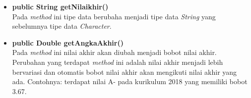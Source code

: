 \begin{enumerate}
\begin{itemize}
\begin{itemize}
					\item \textbf{public String getNilaikhir()}\\
						Pada \textit{method} ini tipe data berubaha menjadi tipe data \textit{String} yang sebelumnya tipe data \textit{Character}.
					
					\item \textbf{public Double getAngkaAkhir()}\\
						Pada \textit{method} ini nilai akhir akan diubah menjadi bobot nilai akhir. Perubahan yang terdapat \textit{method} ini adalah nilai akhir menjadi lebih bervariasi dan otomatis bobot nilai akhir akan mengikuti nilai akhir yang ada. Contohnya: terdapat nilai A- pada kurikulum 2018 yang memiliki bobot 3.67. 
				\end{itemize}
		\end{itemize}
\end{enumerate}